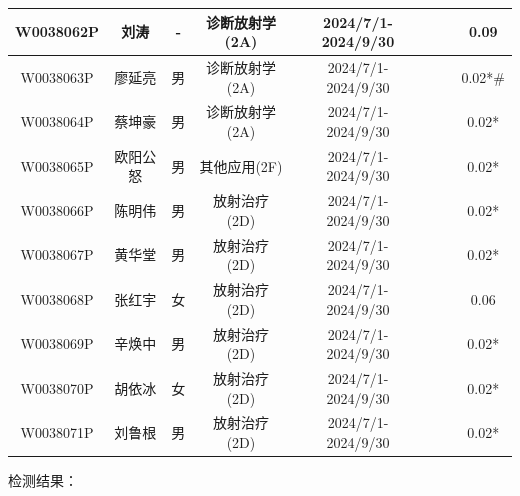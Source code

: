 \begin{table}[H]
\begin{tabular}{|c|c|c|c|c|c|c|c|}
\hline
W0038062P & 刘涛 & - & 诊断放射学(2A) & 2024/7/1-2024/9/30 &  &  & 0.09 \\
\hline
W0038063P & 廖延亮 & 男 & 诊断放射学(2A) & 2024/7/1-2024/9/30 &  &  & 0.02*\# \\
\hline
W0038064P & 蔡坤豪 & 男 & 诊断放射学(2A) & 2024/7/1-2024/9/30 &  &  & 0.02* \\
\hline
W0038065P & 欧阳公怒 & 男 & 其他应用(2F) & 2024/7/1-2024/9/30 &  &  & 0.02* \\
\hline
W0038066P & 陈明伟 & 男 & 放射治疗(2D) & 2024/7/1-2024/9/30 &  &  & 0.02* \\
\hline
W0038067P & 黄华堂 & 男 & 放射治疗(2D) & 2024/7/1-2024/9/30 &  &  & 0.02* \\
\hline
W0038068P & 张红宇 & 女 & 放射治疗(2D) & 2024/7/1-2024/9/30 &  &  & 0.06 \\
\hline
W0038069P & 辛焕中 & 男 & 放射治疗(2D) & 2024/7/1-2024/9/30 &  &  & 0.02* \\
\hline
W0038070P & 胡依冰 & 女 & 放射治疗(2D) & 2024/7/1-2024/9/30 &  &  & 0.02* \\
\hline
W0038071P & 刘鲁根 & 男 & 放射治疗(2D) & 2024/7/1-2024/9/30 &  &  & 0.02* \\
\hline
\end{tabular}
\end{table}


检测结果：


